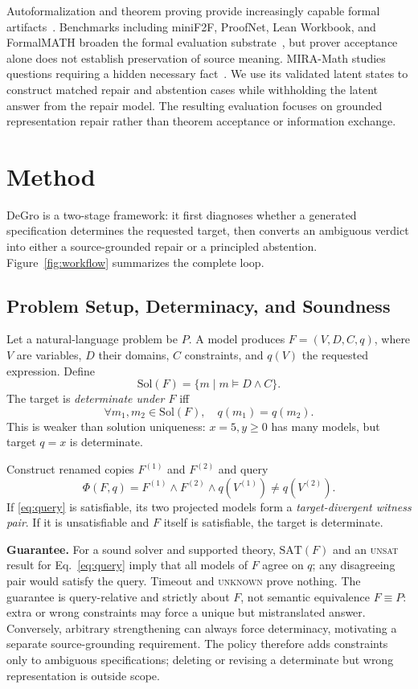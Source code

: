 \documentclass[sigconf,anonymous]{aamas}
\begin{document}
Autoformalization and theorem proving provide increasingly capable formal artifacts~\cite{wu2022autoformalization,jiang2024mma,jiang2023draft,yang2023leandojo,azerbayev2024llemma,xin2024deepseekprover}.  Benchmarks including miniF2F, ProofNet, Lean Workbook, and FormalMATH broaden the formal evaluation substrate~\cite{zheng2022minif2f,azerbayev2023proofnet,ying2024leanworkbook,yu2025formalmath}, but prover acceptance alone does not establish preservation of source meaning.  MIRA-Math studies questions requiring a hidden necessary fact~\cite{albateh2026mira}.  We use its validated latent states to construct matched repair and abstention cases while withholding the latent answer from the repair model.  The resulting evaluation focuses on grounded representation repair rather than theorem acceptance or information exchange.

\section{Method}
DeGro is a two-stage framework: it first diagnoses whether a generated specification determines the requested target, then converts an ambiguous verdict into either a source-grounded repair or a principled abstention.  Figure~\ref{fig:workflow} summarizes the complete loop.

\subsection{Problem Setup, Determinacy, and Soundness}
Let a natural-language problem be $P$.  A model produces $F=(V,D,C,q)$, where $V$ are variables, $D$ their domains, $C$ constraints, and $q(V)$ the requested expression.  Define
\[
\mathrm{Sol}(F)=\{m\mid m\models D\land C\}.
\]
The target is \emph{determinate under $F$} iff
\[
\forall m_1,m_2\in\mathrm{Sol}(F),\quad q(m_1)=q(m_2).
\]
This is weaker than solution uniqueness: $x=5,y\geq0$ has many models, but target $q=x$ is determinate.

Construct renamed copies $F^{(1)}$ and $F^{(2)}$ and query
\begin{equation}
\Phi(F,q)=F^{(1)}\land F^{(2)}\land q(V^{(1)})\neq q(V^{(2)}).\label{eq:query}
\end{equation}
If \eqref{eq:query} is satisfiable, its two projected models form a \emph{target-divergent witness pair}.  If it is unsatisfiable and $F$ itself is satisfiable, the target is determinate.

\textbf{Guarantee.} For a sound solver and supported theory, $\mathrm{SAT}(F)$ and an \textsc{unsat} result for Eq.~\eqref{eq:query} imply that all models of $F$ agree on $q$; any disagreeing pair would satisfy the query.  Timeout and \textsc{unknown} prove nothing.  The guarantee is query-relative and strictly about $F$, not semantic equivalence $F\equiv P$: extra or wrong constraints may force a unique but mistranslated answer.  Conversely, arbitrary strengthening can always force determinacy, motivating a separate source-grounding requirement.  The policy therefore adds constraints only to ambiguous specifications; deleting or revising a determinate but wrong representation is outside scope.
\end{document}

